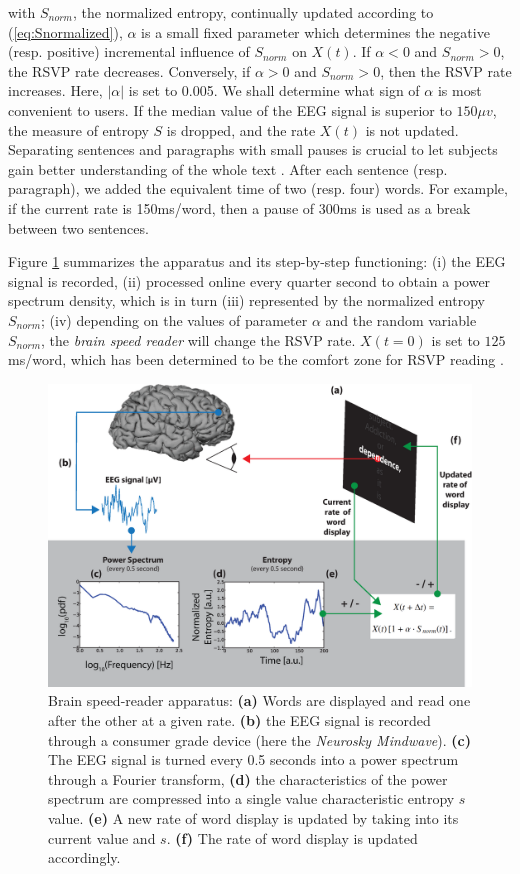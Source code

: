with $S_{norm}$, the normalized entropy, continually updated according to (\ref{eq:Snormalized}), $\alpha$ is a small fixed parameter which determines the negative (resp. positive) incremental influence of $S_{norm}$ on $X(t)$. If $\alpha < 0$ and $S_{norm} > 0$, the RSVP rate decreases. Conversely, if $\alpha > 0$ and $S_{norm} > 0$, then the RSVP rate increases. Here, $|\alpha|$ is set to 0.005. We shall determine what sign of $\alpha$ is most convenient to users. If the median value of the EEG signal is superior to $150\mu v$, the measure of entropy $S$ is dropped, and the rate $X(t)$ is not updated. Separating sentences and paragraphs with small pauses is crucial to let subjects gain better understanding of the whole text \cite{}. After each sentence (resp. paragraph), we added the equivalent time of two (resp. four) words. For example, if the current rate is 150ms/word, then a pause of 300ms is used as a break between two sentences. 

Figure \ref{fig:apparatus} summarizes the apparatus and its step-by-step functioning: (i) the EEG signal is recorded, (ii)  processed online every quarter second  to obtain a power spectrum density, which is in turn (iii) represented by the normalized entropy  $S_{norm}$; (iv) depending on the values of parameter $\alpha$ and the random variable $S_{norm}$, the {\it brain speed reader} will change the RSVP rate. $X(t=0)$ is set to $125$ ms/word, which has been determined to be the comfort zone for RSVP reading \cite{kujala2007phase}.

\begin{figure}[!h]
\centering
\includegraphics[width=0.9\columnwidth]{../figures2/apparatus.eps}
\caption{Brain speed-reader apparatus: {\bf (a)} Words are displayed and read one after the other at a given rate. {\bf (b)} the EEG signal is recorded through a consumer grade device (here the {\it Neurosky Mindwave}). {\bf (c)} The EEG signal is turned every 0.5 seconds into a power spectrum through a Fourier transform, {\bf (d)} the characteristics of the power spectrum are compressed into a single value characteristic entropy $s$ value. {\bf (e)} A new rate of word display is updated by taking into its current value and $s$. {\bf (f)} The rate of word display is updated accordingly.}
\label{fig:apparatus}
\end{figure}


